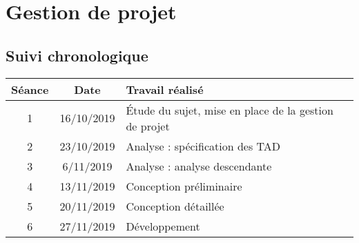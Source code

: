 \section{Gestion de projet}
\subsection{Suivi chronologique}
\begin{table}[h]
\centering
\begin{tabular}{|c|c|l|}
\hline
Séance                                                     & Date                                                              & Travail réalisé                                                                                                                                                  \\ \hline
1                                                          & 16/10/2019                                                        & Étude du sujet, mise en place de la gestion de projet
                                                                                          \\ \hline
2                                                          & 23/10/2019                                                        & Analyse : spécification des TAD  
                                                                                          \\ \hline
3                                                          & 6/11/2019                                                        & Analyse : analyse descendante 
                                                                                          \\ \hline
4                                                          & 13/11/2019                                                        & Conception préliminaire 
                                                                                          \\ \hline
5                                                          & 20/11/2019                                                        & Conception détaillée
                                                                                          \\ \hline
6                                                          & 27/11/2019                                                        & Développement 
                                                                                          \\ \hline

\end{tabular}
\end{table}
